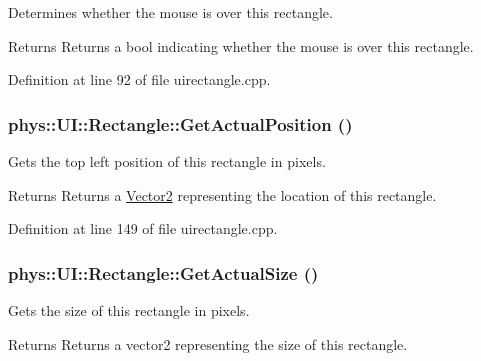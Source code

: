 Determines whether the mouse is over this rectangle. 

\begin{DoxyReturn}{Returns}
Returns a bool indicating whether the mouse is over this rectangle. 
\end{DoxyReturn}


Definition at line 92 of file uirectangle.cpp.

\hypertarget{classphys_1_1UI_1_1Rectangle_a976f977ee23e805b4a193fc0f9e8392f}{
\subsubsection[{GetActualPosition}]{ phys::UI::Rectangle::GetActualPosition ()}}
\label{d1/d5d/classphys_1_1UI_1_1Rectangle_a976f977ee23e805b4a193fc0f9e8392f}


Gets the top left position of this rectangle in pixels. 

\begin{DoxyReturn}{Returns}
Returns a \hyperlink{classphys_1_1Vector2}{Vector2} representing the location of this rectangle. 
\end{DoxyReturn}


Definition at line 149 of file uirectangle.cpp.

\hypertarget{classphys_1_1UI_1_1Rectangle_ae29501765e3af7eac37d5ac581e77b24}{
\subsubsection[{GetActualSize}]{ phys::UI::Rectangle::GetActualSize ()}}
\label{d1/d5d/classphys_1_1UI_1_1Rectangle_ae29501765e3af7eac37d5ac581e77b24}


Gets the size of this rectangle in pixels. 

\begin{DoxyReturn}{Returns}
Returns a vector2 representing the size of this rectangle. 
\end{DoxyReturn}


